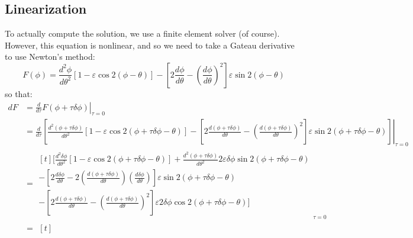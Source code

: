 \documentclass[reqno]{article}
\begin{document}
\subsection{Linearization}

To actually compute the solution, we use a finite element solver (of course).
However, this equation is nonlinear, and so we need to take a Gateau derivative to use Newton's method:
\begin{equation}
    F(\phi) =
    \frac{d^2 \phi}{d \theta^2}
    \left[ 1 - \varepsilon \cos 2 \left( \phi - \theta \right) \right]
    - \left[ 2 \frac{d \phi}{d\theta} - \left( \frac{d \phi}{d\theta} \right)^2 \right]
    \varepsilon \sin 2 \left( \phi - \theta \right)
\end{equation}
so that:
\begin{equation}
    \begin{split}
    dF
    &=
        \left.\frac{d}{d\tau} F(\phi + \tau \delta \phi) \right|_{\tau = 0} \\
    &=
    \left.
    \frac{d}{d\tau}
    \left[
        \frac{d^2 (\phi + \tau \delta \phi)}{d \theta^2}
        \left[1 - \varepsilon \cos 2 (\phi + \tau \delta \phi - \theta)\right]
        - 
        \left[
            2 \frac{d (\phi + \tau \delta \phi)}{d\theta}
            - \left(\frac{d (\phi + \tau \delta \phi)}{d \theta} \right)^2
        \right]
    \varepsilon \sin 2 (\phi + \tau \delta \phi - \theta)
    \right]
    \right|_{\tau = 0} \\
    &=
    \begin{multlined}[t]
    \biggl[
        \frac{d^2 \delta \phi}{d \theta^2}
        \left[ 1 - \varepsilon \cos 2 (\phi + \tau \delta \phi - \theta) \right]
        + \frac{d^2 (\phi + \tau \delta \phi)}{d \theta^2}
         2 \varepsilon \delta \phi \sin 2 (\phi + \tau \delta \phi - \theta) \\
        - \left[ 2 \frac{d \delta \phi}{d \theta} 
            - 2 \left(\frac{d (\phi + \tau \delta \phi)}{d \theta} \right) \left( \frac{d \delta \phi}{d \theta} \right)
          \right]
            \varepsilon \sin 2 (\phi + \tau \delta \phi - \theta) \\
        - \left[ 2 \frac{ d (\phi + \tau \delta \phi)}{d\theta}
            - \left( \frac{d(\phi + \tau \delta \phi)}{d \theta} \right)^2
          \right]
            \varepsilon 2 \delta \phi \cos 2 (\phi + \tau \delta \phi - \theta)
    \biggr]
    \end{multlined}_{\tau = 0} \\
    &=
    \begin{multlined}[t]

\end{multlined}
\end{split}
\end{equation}
\end{document}
